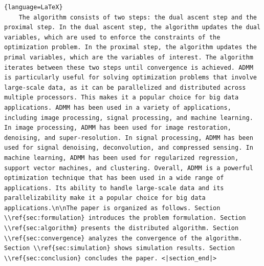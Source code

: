 \begin{lstlisting}{language=LaTeX}
    The algorithm consists of two steps: the dual ascent step and the proximal step. In the dual ascent step, the algorithm updates the dual variables, which are used to enforce the constraints of the optimization problem. In the proximal step, the algorithm updates the primal variables, which are the variables of interest. The algorithm iterates between these two steps until convergence is achieved. ADMM is particularly useful for solving optimization problems that involve large-scale data, as it can be parallelized and distributed across multiple processors. This makes it a popular choice for big data applications. ADMM has been used in a variety of applications, including image processing, signal processing, and machine learning. In image processing, ADMM has been used for image restoration, denoising, and super-resolution. In signal processing, ADMM has been used for signal denoising, deconvolution, and compressed sensing. In machine learning, ADMM has been used for regularized regression, support vector machines, and clustering. Overall, ADMM is a powerful optimization technique that has been used in a wide range of applications. Its ability to handle large-scale data and its parallelizability make it a popular choice for big data applications.\n\nThe paper is organized as follows. Section \\ref{sec:formulation} introduces the problem formulation. Section \\ref{sec:algorithm} presents the distributed algorithm. Section \\ref{sec:convergence} analyzes the convergence of the algorithm. Section \\ref{sec:simulation} shows simulation results. Section \\ref{sec:conclusion} concludes the paper. <|section_end|>
\end{lstlisting}


